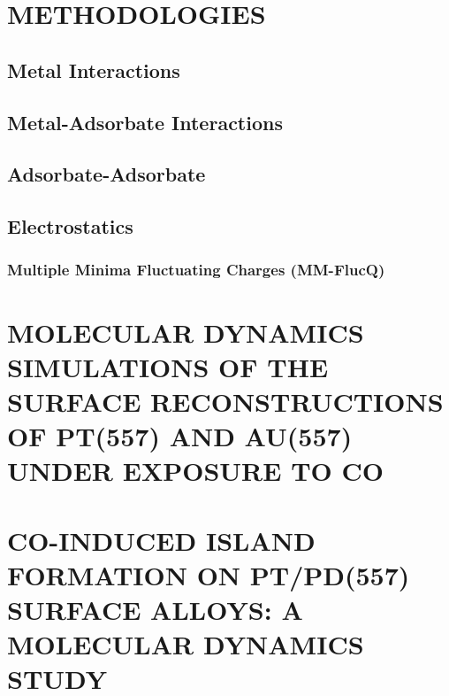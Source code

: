 \documentclass[draft]{nddiss2e}
\begin{document}

\chapter{METHODOLOGIES}

\section{Metal Interactions}

\section{Metal-Adsorbate Interactions}
%

\section{Adsorbate-Adsorbate}

\section{Electrostatics}


\subsection{Multiple Minima Fluctuating Charges (MM-FlucQ)}

\chapter{MOLECULAR DYNAMICS SIMULATIONS OF THE SURFACE RECONSTRUCTIONS OF PT(557) AND AU(557) UNDER EXPOSURE TO CO}


\chapter{CO-INDUCED ISLAND FORMATION ON PT/PD(557) SURFACE ALLOYS: A MOLECULAR DYNAMICS STUDY}
\end{document}
